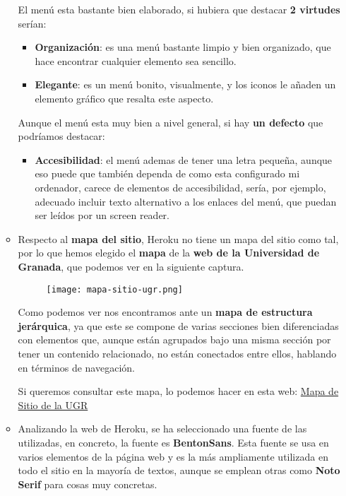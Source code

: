 \begin{enumerate}[label=\alph*)]
\begin{itemize}
        El menú esta bastante bien elaborado, si hubiera que destacar \textbf{2 virtudes} serían:
        \begin{itemize}
            \item \textbf{Organización}: es una menú bastante limpio y bien organizado, que hace encontrar cualquier elemento sea sencillo.
            \item \textbf{Elegante}: es un menú bonito, visualmente, y los iconos le añaden un elemento gráfico que resalta este aspecto.
        \end{itemize}

        Aunque el menú esta muy bien a nivel general, si hay \textbf{un defecto} que podríamos destacar:
        \begin{itemize}
            \item \textbf{Accesibilidad}: el menú ademas de tener una letra pequeña, aunque eso puede que también dependa de como esta configurado mi ordenador, carece de elementos de accesibilidad, sería, por ejemplo, adecuado incluir texto alternativo a los enlaces del menú, que puedan ser leídos por un screen reader.
        \end{itemize}

        \item Respecto al \textbf{mapa del sitio}, Heroku no tiene un mapa del sitio como tal, por lo que hemos elegido el \textbf{mapa} de la \textbf{web de la Universidad de Granada}, que podemos ver en la siguiente captura.

        \begin{figure}[H]
            \centering
            \texttt{[image: mapa-sitio-ugr.png]}
        \end{figure}

        Como podemos ver nos encontramos ante un \textbf{mapa de estructura jerárquica}, ya que este se compone de varias secciones bien diferenciadas con elementos que, aunque están agrupados bajo una misma sección por tener un contenido relacionado, no están conectados entre ellos, hablando en términos de navegación.

        Si queremos consultar este mapa, lo podemos hacer en esta web: \href{https://www.ugr.es/sitemap}{Mapa de Sitio de la UGR}

        \item Analizando la web de Heroku, se ha seleccionado una fuente de las utilizadas, en concreto, la fuente es \textbf{BentonSans}. Esta fuente se usa en varios elementos de la página web y es la más ampliamente utilizada en todo el sitio en la mayoría de textos, aunque se emplean otras como \textbf{Noto Serif} para cosas muy concretas.


\end{itemize}
\end{enumerate}
